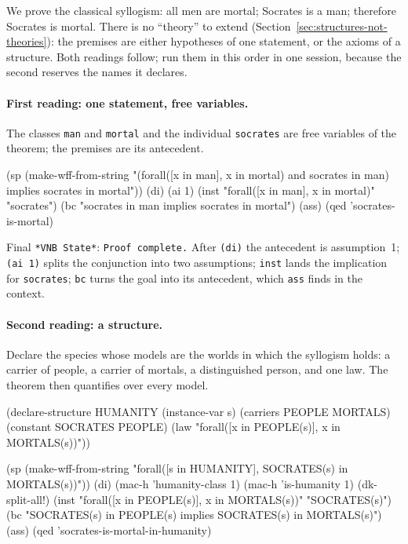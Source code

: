 We prove the classical syllogism: all men are mortal; Socrates is a
man; therefore Socrates is mortal.  There is no ``theory'' to extend
(Section~\ref{sec:structures-not-theories}): the premises are either
hypotheses of one statement, or the axioms of a structure.  Both
readings follow; run them in this order in one session, because the
second reserves the names it declares.

\paragraph{First reading: one statement, free variables.}
The classes \texttt{man} and \texttt{mortal} and the individual
\texttt{socrates} are free variables of the theorem; the premises are
its antecedent.

\begin{VNBsnip}
(sp (make-wff-from-string
  "(forall([x in man], x in mortal) and socrates in man)
     implies socrates in mortal"))
(di)
(ai 1)
(inst "forall([x in man], x in mortal)" "socrates")
(bc   "socrates in man implies socrates in mortal")
(ass)
(qed  'socrates-is-mortal)
\end{VNBsnip}

Final \texttt{*VNB State*}: \texttt{Proof complete.}  After \texttt{(di)}
the antecedent is assumption~1; \texttt{(ai 1)} splits the conjunction
into two assumptions; \texttt{inst} lands the implication for
\texttt{socrates}; \texttt{bc} turns the goal into its antecedent, which
\texttt{ass} finds in the context.

\paragraph{Second reading: a structure.}
Declare the species whose models are the worlds in which the syllogism
holds: a carrier of people, a carrier of mortals, a distinguished person,
and one law.  The theorem then quantifies over every model.

\begin{VNBsnip}
(declare-structure HUMANITY
  (instance-var s)
  (carriers PEOPLE MORTALS)
  (constant SOCRATES PEOPLE)
  (law "forall([x in PEOPLE(s)], x in MORTALS(s))"))

(sp (make-wff-from-string
  "forall([s in HUMANITY], SOCRATES(s) in MORTALS(s))"))
(di)
(mac-h 'humanity-class 1)
(mac-h 'is-humanity 1)
(dk-split-all!)
(inst "forall([x in PEOPLE(s)], x in MORTALS(s))" "SOCRATES(s)")
(bc   "SOCRATES(s) in PEOPLE(s) implies SOCRATES(s) in MORTALS(s)")
(ass)
(qed  'socrates-is-mortal-in-humanity)
\end{VNBsnip}

